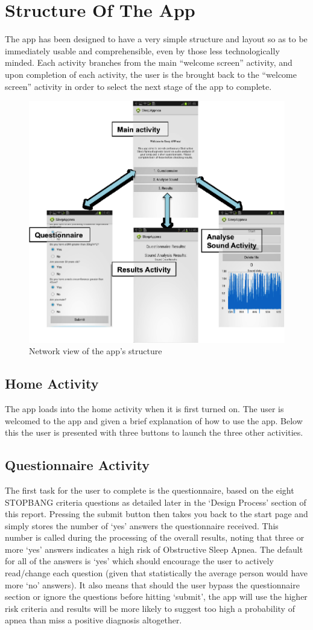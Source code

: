 \section{Structure Of The App}
The app has been designed to have a very simple structure and layout so as to be immediately usable and comprehensible, even by those less technologically minded. Each activity branches from the main “welcome screen” activity, and upon completion of each activity, the user is the brought back to the “welcome screen” activity in order to select the next stage of the app to complete.
\begin{figure}[ht!]
		\centering
			\includegraphics[width=.5\textwidth]{drawings/Structure-network.eps}
		\caption{Network view of the app's structure}
		\label{fig:appStructure}
	\end{figure}
\subsection{Home Activity}
The app loads into the home activity when it is first turned on. The user is welcomed to the app and given a brief explanation of how to use the app. Below this the user is presented with three buttons to launch the three other activities. 
\subsection{Questionnaire Activity}
The first task for the user to complete is the questionnaire, based on the eight STOPBANG criteria questions as detailed later in the ‘Design Process’ section of this report. Pressing the submit button then takes you back to the start page and simply stores the number of ‘yes’ answers the questionnaire received. This number is called during the processing of the overall results, noting that three or more ‘yes’ answers indicates a high risk of Obstructive Sleep Apnea. The default for all of the answers is ‘yes’ which should encourage the user to actively read/change each question (given that statistically the average person would have more ‘no’ answers). It also means that should the user bypass the questionnaire section or ignore the questions before hitting ‘submit’, the app will use the higher risk criteria and results will be more likely to suggest too high a probability of apnea than miss a positive diagnosis altogether. 
